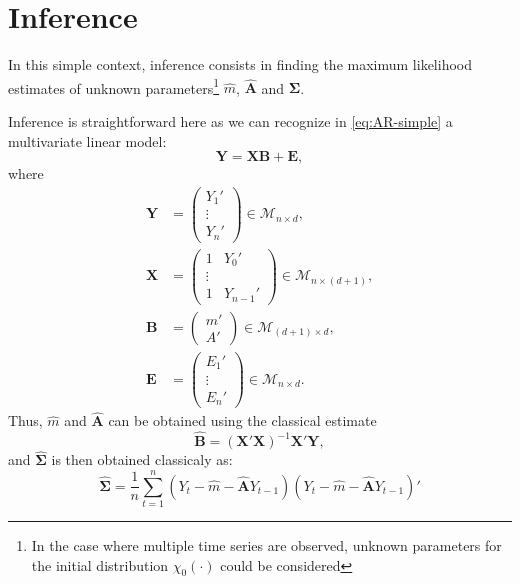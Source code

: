 \documentclass[]{book}
\let\rmarkdownfootnote\footnote%
\def\footnote{\protect\rmarkdownfootnote}
\begin{document}
\hypertarget{inference}{%
\section{Inference}\label{inference}}

In this simple context, inference consists in finding the maximum likelihood estimates of unknown parameters\footnote{In the case where multiple time series are observed, unknown parameters for the initial distribution $\chi_0(\cdot)$ could be considered} \(\hat{m}\), \(\hat{\mathbf{A}}\) and \(\mathbf{\Sigma}\).

Inference is straightforward here as we can recognize in \eqref{eq:AR-simple} a multivariate linear model:
\[\mathbf{Y} = \mathbf{XB} + \mathbf{E},\]
where
\begin{align*}
\mathbf{Y} &= 
\begin{pmatrix}
Y_1'\\
\vdots\\
Y_n'
\end{pmatrix} \in \mathcal{M}_{n \times d},\\
\mathbf{X} &= 
\begin{pmatrix}
1 & Y_0'\\
\vdots\\
1 & Y_{n-1}'
\end{pmatrix} \in \mathcal{M}_{n \times (d+1)},\\
\mathbf{B} &= 
\begin{pmatrix}
m'\\
A'
\end{pmatrix} \in \mathcal{M}_{(d + 1) \times d},\\
\mathbf{E} &= 
\begin{pmatrix}
E_1'\\
\vdots\\
E_n'
\end{pmatrix} \in \mathcal{M}_{n \times d}.
\end{align*}
Thus, \(\hat{m}\) and \(\hat{\mathbf{A}}\) can be obtained using the classical estimate
\begin{equation}
\hat{\mathbf{B}} = \left(\mathbf{X'X}\right)^{-1}\mathbf{X}'\mathbf{Y}, \label{eq:AR-simple-B-hat}
\end{equation}
and \(\hat{\mathbf{\Sigma}}\) is then obtained classicaly as:
\begin{equation}
\hat{\mathbf{\Sigma}} = \frac{1}{n} \sum_{t = 1}^n \left(Y_t - \hat{m} - \hat{\mathbf{A}} Y_{t - 1}\right) \left(Y_t - \hat{m} - \hat{\mathbf{A}} Y_{t - 1}\right)' \label{eq:AR-simple-Sigma-hat}
\end{equation}
\end{document}
